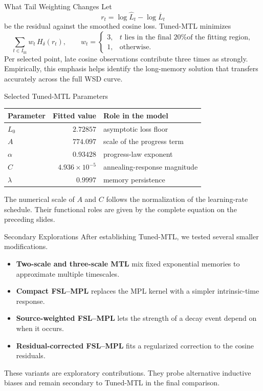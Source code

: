 \documentclass[aspectratio=169]{beamer}
\begin{document}
\begin{frame}{What Tail Weighting Changes}
  Let
  \[
    r_t=\log\widehat L_t-\log \overline L_t
  \]
  be the residual against the smoothed cosine loss. Tuned-MTL minimizes
  \[
    \sum_{t\in I_{\mathrm{fit}}} w_t\,H_{\delta}(r_t),
    \qquad
    w_t=
    \begin{cases}
      3, & t\text{ lies in the final 20\% of the fitting region},\\
      1, & \text{otherwise}.
    \end{cases}
  \]
  Per selected point, late cosine observations contribute three times as strongly. Empirically, this emphasis helps identify the long-memory solution that transfers accurately across the full WSD curve.
\end{frame}

\begin{frame}{Selected Tuned-MTL Parameters}
  \begin{center}
  \small
  \begin{tabular}{lrl}
    \toprule
    Parameter & Fitted value & Role in the model \\
    \midrule
    \(L_0\) & \(2.72857\) & asymptotic loss floor \\
    \(A\) & \(774.097\) & scale of the progress term \\
    \(\alpha\) & \(0.93428\) & progress-law exponent \\
    \(C\) & \(4.936\times 10^{-5}\) & annealing-response magnitude \\
    \(\lambda\) & \(0.9997\) & memory persistence \\
    \bottomrule
  \end{tabular}
  \end{center}
  The numerical scale of \(A\) and \(C\) follows the normalization of the learning-rate schedule. Their functional roles are given by the complete equation on the preceding slides.
\end{frame}

\begin{frame}{Secondary Explorations}
  After establishing Tuned-MTL, we tested several smaller modifications.
  \begin{itemize}
    \item \textbf{Two-scale and three-scale MTL} mix fixed exponential memories to approximate multiple timescales.
    \item \textbf{Compact FSL--MPL} replaces the MPL kernel with a simpler intrinsic-time response.
    \item \textbf{Source-weighted FSL--MPL} lets the strength of a decay event depend on when it occurs.
    \item \textbf{Residual-corrected FSL--MPL} fits a regularized correction to the cosine residuals.
  \end{itemize}
  These variants are exploratory contributions. They probe alternative inductive biases and remain secondary to Tuned-MTL in the final comparison.
\end{frame}
\end{document}
